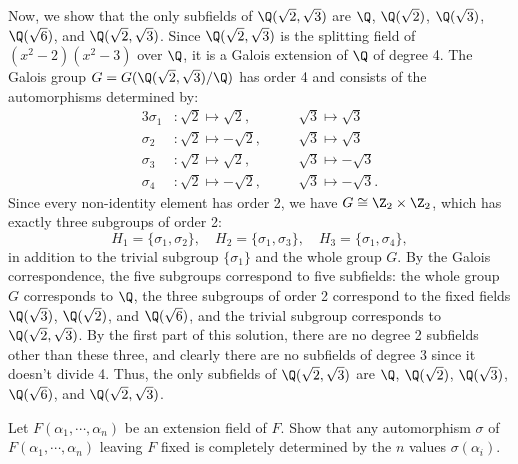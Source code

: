 \begin{solution}
  Now, we show that the only subfields of $\Q(\sqrt{2}, \sqrt{3})$ are $\Q$, $\Q(\sqrt{2})$, $\Q(\sqrt{3})$, $\Q(\sqrt{6})$, and $\Q(\sqrt{2}, \sqrt{3})$. Since $\Q(\sqrt{2}, \sqrt{3})$ is the splitting field of $(x^2 - 2)(x^2 - 3)$ over $\Q$, it is a Galois extension of $\Q$ of degree 4. The Galois group $G = G(\Q(\sqrt{2}, \sqrt{3})/\Q)$ has order 4 and consists of the automorphisms determined by:
  \begin{alignat*}{3}
    \sigma_1 &: \sqrt{2} \mapsto \sqrt{2}, \quad&& \sqrt{3} \mapsto \sqrt{3} \\
    \sigma_2 &: \sqrt{2} \mapsto -\sqrt{2}, \quad&& \sqrt{3} \mapsto \sqrt{3} \\
    \sigma_3 &: \sqrt{2} \mapsto \sqrt{2}, \quad&& \sqrt{3} \mapsto -\sqrt{3} \\
    \sigma_4 &: \sqrt{2} \mapsto -\sqrt{2}, \quad&& \sqrt{3} \mapsto -\sqrt{3}
  .\end{alignat*}
  Since every non-identity element has order 2, we have $G \cong \Z_2 \times \Z_2$, which has exactly three subgroups of order 2:
  \[%
    H_1 = \{\sigma_1, \sigma_2\}, \quad H_2 = \{\sigma_1, \sigma_3\}, \quad H_3 = \{\sigma_1, \sigma_4\}
  ,\]%
  in addition to the trivial subgroup $\{\sigma_1\}$ and the whole group $G$. By the Galois correspondence, the five subgroups correspond to five subfields: the whole group $G$ corresponds to $\Q$, the three subgroups of order 2 correspond to the fixed fields $\Q(\sqrt{3})$, $\Q(\sqrt{2})$, and $\Q(\sqrt{6})$, and the trivial subgroup corresponds to $\Q(\sqrt{2}, \sqrt{3})$. By the first part of this solution, there are no degree 2 subfields other than these three, and clearly there are no subfields of degree 3 since it doesn't divide 4. Thus, the only subfields of $\Q(\sqrt{2}, \sqrt{3})$ are $\Q$, $\Q(\sqrt{2})$, $\Q(\sqrt{3})$, $\Q(\sqrt{6})$, and $\Q(\sqrt{2}, \sqrt{3})$.
\end{solution}

\begin{problem}[43.32]
  Let $F(\alpha_1, \cdots, \alpha_n)$ be an extension field of $F$. Show that any automorphism $\sigma$ of $F(\alpha_1, \cdots, \alpha_n)$ leaving $F$ fixed is completely determined by the $n$ values $\sigma(\alpha_i)$.
\end{problem}

